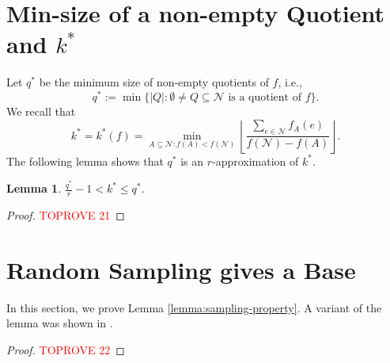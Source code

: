 \documentclass[11pt]{article}
\newtheorem{lemma}{Lemma}
\theoremstyle{definition}
\begin{document}
%
 



\newpage
\appendix
\section{Min-size of a non-empty Quotient and $k^*$}
\label{section:appendix-quotient}
Let $q^*$ be the minimum size of non-empty quotients of $f$, i.e., $$q^*:=\min\{|Q|:\emptyset\neq Q\subseteq \mathcal{N} \text{ is a quotient of $f$}\}.$$
We recall that 
$$
    k^*=k^*(f)=\min_{A\subseteq \mathcal{N}: f(A)<f(\mathcal{N})} \left\lfloor \frac{\sum_{e\in \mathcal{N}}f_A(e)}{f(\mathcal{N})-f(A)}\right\rfloor.
$$
The following lemma shows that $q^*$ is an $r$-approximation of $k^*$.

\begin{lemma}\label{lemma:opt-estimation}
    $\frac{q^*}{r}-1< k^*\leq q^*$.
\end{lemma}
\begin{proof}\textcolor{red}{TOPROVE 21}\end{proof}

\section{Random Sampling gives a Base}\label{sec:random-sampling-to-get-base}
In this section, we prove Lemma \ref{lemma:sampling-property}. A variant of the lemma was shown in \cite{CCV09}. 
\lemmaRandomSamplingGivesBase*
\begin{proof}\textcolor{red}{TOPROVE 22}\end{proof} 
\end{document}
